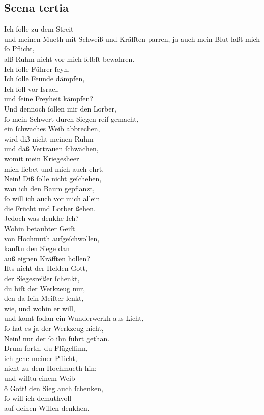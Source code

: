 \documentclass{ees}
\newenvironment{lyrics}[1]{%
  \subsection{#1}\nopagebreak%
  \begin{lyricslist}%
  \let\voice\item%
}{%
  \end{lyricslist}%
}
\begin{document}
\begin{lyrics}{Scena tertia}
  \voice[Barak]
  Ich ſolle zu dem Streit\\
  und meinen Mueth mit Schweiß und Kräfften parren,
  ja auch mein Blut laßt mich ſo Pflicht,\\
  alß Ruhm nicht vor mich ſelbſt bewahren.\\
  Ich ſolle Führer ſeyn,\\
  Ich ſolle Feunde dämpfen,\\
  Ich ſoll vor Israel,\\
  und ſeine Freyheit kämpfen?\\
  Und dennoch ſollen mir den Lorber,\\
  ſo mein Schwert durch Siegen reif gemacht,\\
  ein ſchwaches Weib abbrechen,\\
  wird diß nicht meinen Ruhm\\
  und daß Vertrauen ſchwächen,\\
  womit mein Kriegesheer\\
  mich liebet und mich auch ehrt.\\
  Nein! Diß ſolle nicht geſchehen,\\
  wan ich den Baum gepflanzt,\\
  ſo will ich auch vor mich allein\\
  die Frücht und Lorber ßehen.\\
  Jedoch was denkhe Ich?\\
  Wohin betaubter Geiſt\\
  von Hochmuth aufgeſchwollen,\\
  kanſtu den Siege dan\\
  auß eignen Kräfften hollen?\\
  Iſts nicht der Helden Gott,\\
  der Siegesreißer ſchenkt,\\
  du biſt der Werkzeug nur,\\
  den da ſein Meiſter lenkt,\\
  wie, und wohin er will,\\
  und komt ſodan ein Wunderwerkh aus Licht,\\
  ſo hat es ja der Werkzeug nicht,\\
  Nein! nur der ſo ihn führt gethan.\\
  Drum forth, du Flügelſinn,\\
  ich gehe meiner Pflicht,\\
  nicht zu dem Hochmueth hin;\\
  und wilſtu einem Weib\\
  ô Gott! den Sieg auch ſchenken,\\
  ſo will ich demuthvoll\\
  auf deinen Willen denkhen.
\end{lyrics}
\end{document}
